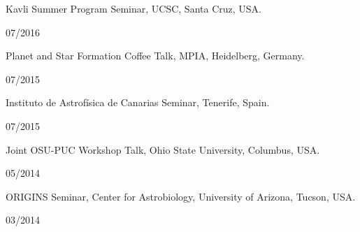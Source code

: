 \documentclass[12pt, a4paper]{article} %
\begin{document}
\begin{minipage}[t]{0.7\textwidth}
\begin{flushleft}%
  \setlength{\leftskip}{0.2cm}%
Kavli Summer Program Seminar, UCSC, Santa Cruz, USA.
\end{flushleft}
\end{minipage}
\begin{minipage}[t]{0.3\textwidth}
\hfill 07/2016
\end{minipage}

\begin{minipage}[t]{0.7\textwidth}
\begin{flushleft}%
  \setlength{\leftskip}{0.2cm}%
Planet and Star Formation Coffee Talk, MPIA,  Heidelberg, Germany.
\end{flushleft}
\end{minipage}
\begin{minipage}[t]{0.3\textwidth}
\hfill 07/2015
\end{minipage}

\begin{minipage}[t]{0.7\textwidth}
\begin{flushleft}%
  \setlength{\leftskip}{0.2cm}%
Instituto de Astrof\'isica de Canarias Seminar, Tenerife, Spain.
\end{flushleft}
\end{minipage}
\begin{minipage}[t]{0.3\textwidth}
\hfill 07/2015
\end{minipage}
\begin{minipage}[t]{0.7\textwidth}
\begin{flushleft}%
  \setlength{\leftskip}{0.2cm}%
Joint OSU-PUC Workshop Talk, Ohio State University, Columbus, USA.
\end{flushleft}
\end{minipage}
\begin{minipage}[t]{0.3\textwidth}
\hfill 05/2014
\end{minipage}

\begin{minipage}[t]{0.7\textwidth}
\begin{flushleft}%
  \setlength{\leftskip}{0.2cm}%
ORIGINS Seminar, Center for Astrobiology, University of Arizona, Tucson, USA.
\end{flushleft}
\end{minipage}
\begin{minipage}[t]{0.3\textwidth}
\hfill 03/2014
\end{minipage}
\end{document}
